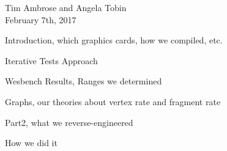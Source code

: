 \documentclass[12pt, oneside]{amsart}
\begin{document}
\raggedright
Tim Ambrose and Angela Tobin\\
February 7th, 2017\\

\raggedright

\bigskip
Introduction, which graphics cards, how we compiled, etc.

\bigskip
Iterative Tests Approach

\bigskip
Wesbench Results, Ranges we determined

\bigskip
Graphs, our theories about vertex rate and fragment rate

\bigskip
Part2, what we reverse-engineered

\bigskip
How we did it
\end{document}
